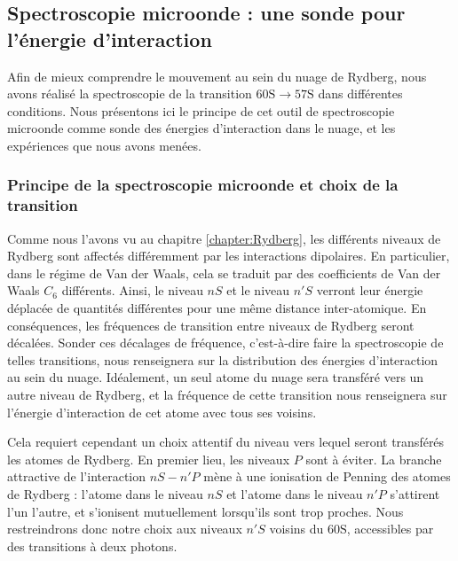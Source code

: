 	\subsection{Spectroscopie microonde : une sonde pour l'énergie d'interaction}
\noindent Afin de mieux comprendre le mouvement au sein du nuage de Rydberg, nous avons réalisé la spectroscopie de la transition $\mathrm{60S} \rightarrow \mathrm{57S}$ dans différentes conditions.
Nous présentons ici le principe de cet outil de spectroscopie microonde comme sonde des énergies d'interaction dans le nuage, et les expériences que nous avons menées.

	\subsubsection*{Principe de la spectroscopie microonde et choix de la transition}
\noindent Comme nous l'avons vu au chapitre \ref{chapter:Rydberg}, les différents niveaux de Rydberg sont affectés différemment par les interactions dipolaires.
En particulier, dans le régime de Van der Waals, cela se traduit par des coefficients de Van der Waals $C_6$ différents.
Ainsi, le niveau $nS$ et le niveau $n'S$ verront leur énergie déplacée de quantités différentes pour une même distance inter-atomique.
En conséquences, les fréquences de transition entre niveaux de Rydberg seront décalées.
Sonder ces décalages de fréquence, c'est-à-dire faire la spectroscopie de telles transitions, nous renseignera sur la distribution des énergies d'interaction au sein du nuage.
Idéalement, un seul atome du nuage sera transféré vers un autre niveau de Rydberg, et la fréquence de cette transition nous renseignera sur l'énergie d'interaction de cet atome avec tous ses voisins.

Cela requiert cependant un choix attentif du niveau vers lequel seront transférés les atomes de Rydberg.
En premier lieu, les niveaux $P$ sont à éviter.
La branche attractive de l'interaction $nS - n'P$ mène à une ionisation de Penning des atomes de Rydberg : l'atome dans le niveau $nS$ et l'atome dans le niveau $n'P$ s'attirent l'un l'autre, et s'ionisent mutuellement lorsqu'ils sont trop proches.
Nous restreindrons donc notre choix aux niveaux $n'S$ voisins du $\mathrm{60S}$, accessibles par des transitions à deux photons.

